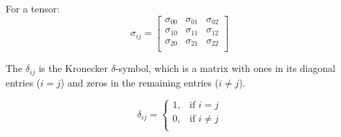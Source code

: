 \noindent For a tensor:
\begin{equation}
\sigma _{ij}= 
\left[ \begin{array}{ccc}
\sigma_{00} & \sigma_{01} & \sigma_{02} \\
\sigma_{10} & \sigma_{11} & \sigma_{12} \\
\sigma_{20} & \sigma_{21} & \sigma_{22} \\
\end{array} \right]
\label{NOTATION6}
\end{equation}

The $\delta_{ij}$ is the Kronecker $\delta$-symbol, which is a matrix with ones
in its diagonal entries ($i = j$) and zeros in the remaining entries
($i \neq j$).

\begin{equation}
\delta _{ij} = 
\left \{ \begin{array}{cc}
1, & \mbox{if $i = j$} \\
0, & \mbox{if $i \neq j$} \\
\end{array}
\right.
\label{KRONECKER}
\end{equation}

